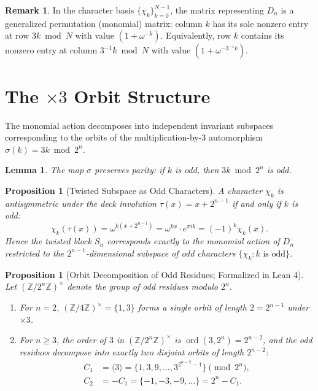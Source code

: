 \documentclass[11pt,reqno]{amsart}
\newtheorem{lemma}[theorem]{Lemma}
\newtheorem{proposition}[theorem]{Proposition}
\theoremstyle{definition}
\newtheorem{remark}[theorem]{Remark}
\begin{document}
\begin{remark}\label{rem:monomial-matrix}
In the character basis $\{\chi_k\}_{k=0}^{N-1}$, the matrix representing $D_n$ is a generalized permutation (monomial) matrix: column $k$ has its sole nonzero entry at row $3k \bmod N$ with value $(1 + \omega^{-k})$. Equivalently, row $k$ contains its nonzero entry at column $3^{-1}k \bmod N$ with value $(1 + \omega^{-3^{-1}k})$.
\end{remark}

\section{The $\times 3$ Orbit Structure}\label{sec:orbits}

The monomial action decomposes into independent invariant subspaces corresponding to the orbits of the multiplication-by-3 automorphism $\sigma(k) = 3k \bmod 2^n$.

\begin{lemma}\label{lem:parity}
The map $\sigma$ preserves parity: if $k$ is odd, then $3k \bmod 2^n$ is odd.
\end{lemma}

\begin{proposition}[Twisted Subspace as Odd Characters]\label{prop:odd-char}
A character $\chi_k$ is antisymmetric under the deck involution $\tau(x) = x + 2^{n-1}$ if and only if $k$ is odd:
\[
\chi_k(\tau(x)) = \omega^{k(x + 2^{n-1})} = \omega^{kx} \cdot e^{\pi i k} = (-1)^k \chi_k(x).
\]
Hence the twisted block $S_n$ corresponds exactly to the monomial action of $D_n$ restricted to the $2^{n-1}$-dimensional subspace of odd characters $\{ \chi_k : k \text{ is odd} \}$.
\end{proposition}

\begin{proposition}[Orbit Decomposition of Odd Residues; Formalized in Lean 4]\label{prop:orbits}
Let $(\mathbb{Z}/2^n\mathbb{Z})^\times$ denote the group of odd residues modulo $2^n$.
\begin{enumerate}
\item For $n = 2$, $(\mathbb{Z}/4\mathbb{Z})^\times = \{1, 3\}$ forms a single orbit of length $2 = 2^{n-1}$ under $\times 3$.
\item For $n \ge 3$, the order of $3$ in $(\mathbb{Z}/2^n\mathbb{Z})^\times$ is $\operatorname{ord}(3, 2^n) = 2^{n-2}$, and the odd residues decompose into exactly two disjoint orbits of length $2^{n-2}$:
\begin{align*}
C_1 &= \langle 3 \rangle = \{1, 3, 9, \ldots, 3^{2^{n-2}-1}\} \pmod{2^n}, \\
C_2 &= -C_1 = \{-1, -3, -9, \ldots\} = 2^n - C_1.
\end{align*}
\end{enumerate}
\end{proposition}
\end{document}
